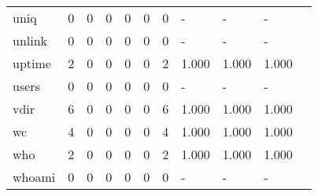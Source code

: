 \begin{longtable}{lp{1.10cm}p{1.10cm}p{1.10cm}p{1.10cm}p{1.10cm}p{1.10cm}p{1.10cm}p{1.10cm}p{1.10cm}p{1.10cm}}
uniq      &                      0 &                                  0 &                                 0 &                                0 &                                 0 &                               0 &                              - &                                     - &                                   - \\
unlink    &                      0 &                                  0 &                                 0 &                                0 &                                 0 &                               0 &                              - &                                     - &                                   - \\
uptime    &                      2 &                                  0 &                                 0 &                                0 &                                 0 &                               2 &                          1.000 &                                 1.000 &                               1.000 \\
users     &                      0 &                                  0 &                                 0 &                                0 &                                 0 &                               0 &                              - &                                     - &                                   - \\
vdir      &                      6 &                                  0 &                                 0 &                                0 &                                 0 &                               6 &                          1.000 &                                 1.000 &                               1.000 \\
wc        &                      4 &                                  0 &                                 0 &                                0 &                                 0 &                               4 &                          1.000 &                                 1.000 &                               1.000 \\
who       &                      2 &                                  0 &                                 0 &                                0 &                                 0 &                               2 &                          1.000 &                                 1.000 &                               1.000 \\
whoami    &                      0 &                                  0 &                                 0 &                                0 &                                 0 &                               0 &                              - &                                     - &                                   - \\

\end{longtable}
